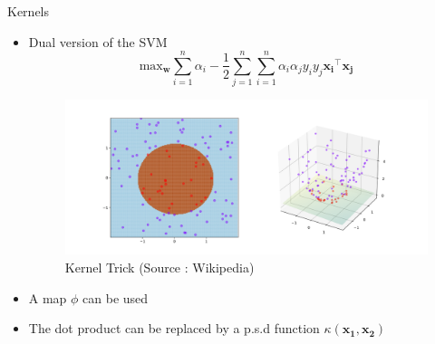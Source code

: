 \documentclass[compress]{beamer}
\DeclarePairedDelimiter{\norm}{\lVert}{\rVert}
\let\vec\mathbf
\begin{document}
\begin{frame}{Kernels}
	\begin{itemize}
		\item Dual version of the SVM
		\vspace*{-0.15cm}
		\begin{equation*}
		\text{max}_{\vec{w}} \sum\limits_{i=1}^{n} \alpha_i - \frac{1}{2} \sum\limits_{j=1}^{n}\sum\limits_{i=1}^{n}\alpha_{i}\alpha_{j}y_{i}y_{j}\vec{x_{i}}^{\top}\vec{x_{j}}
		\end{equation*}
		\vspace*{-0.6cm}
		\begin{figure}
			\includegraphics[height=0.4\textheight]{data/kernel.png}
			\caption*{Kernel Trick (Source : Wikipedia)}
		\end{figure}
		\vspace*{-0.25cm}
		\item A map $\phi$ can be used
		\item The dot product can be replaced by a p.s.d function $\kappa(\vec{x_{1}},\vec{x_{2}})$
	\end{itemize}
\end{frame}
\end{document}
